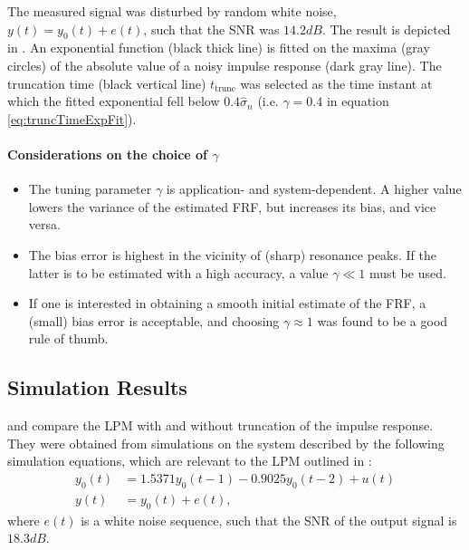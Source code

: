 The measured signal was disturbed by random white noise, $y(t) = y_0(t) + e(t)$, such that the \gls{SNR} was $14.2\unit{dB}$.
The result is depicted in . An exponential function (black thick line) is fitted on the maxima (gray circles) of the absolute value of a noisy impulse response (dark gray line). The truncation time (black vertical line) $t_\mathrm{trunc}$ was selected as the time instant at which the fitted exponential fell below $0.4\hat\sigma_n$ (i.e. $\gamma = 0.4$ in equation \eqref{eq:truncTimeExpFit}).

\paragraph*{Considerations on the choice of $\gamma$}

\begin{itemize}
\item The tuning parameter $\gamma$ is application- and system-dependent.  A higher value lowers the variance of the estimated \gls{FRF}, but increases its bias, and vice versa.

\item
The bias error is highest in the vicinity of (sharp) resonance peaks. If the latter is to be estimated with a high accuracy, a value $\gamma \ll 1$ must be used. %

\item If one is interested in obtaining a smooth initial estimate of the \gls{FRF}, a (small) bias error is acceptable, and choosing $\gamma \approx 1$ was found to be a good rule of thumb.
\end{itemize}

\subsection{Simulation Results}\label{se:simResults}

 and  compare the \gls{LPM} with and without truncation of the impulse response.
They were obtained from simulations on  the system described by the following simulation equations, which are relevant to the \gls{LPM} outlined in :
\begin{subequations}
\label{eq:systemSimulations}
\begin{align}
y_0(t)  &= 1.5371y_0(t-1)    -0.9025y_0(t-2) + u(t)
\\
y(t) &= y_0(t) + e(t),
\end{align}
\end{subequations}
where $e(t)$ is a white noise sequence, such that the \gls{SNR} of the output signal is $18.3\unit{dB}$.


